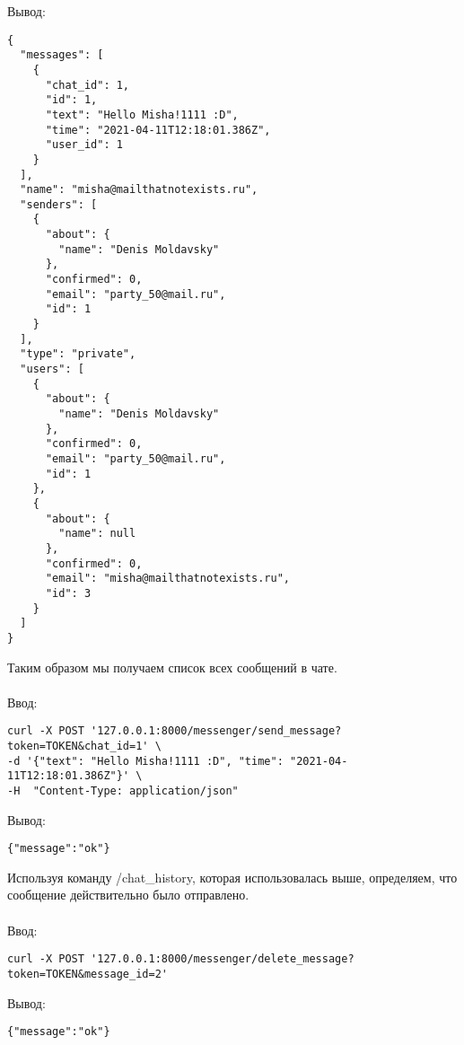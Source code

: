 \documentclass[testmethods]{espd}
\begin{document}
Вывод:

\begin{verbatim}
{
  "messages": [
    {
      "chat_id": 1,
      "id": 1,
      "text": "Hello Misha!1111 :D",
      "time": "2021-04-11T12:18:01.386Z",
      "user_id": 1
    }
  ],
  "name": "misha@mailthatnotexists.ru",
  "senders": [
    {
      "about": {
        "name": "Denis Moldavsky"
      },
      "confirmed": 0,
      "email": "party_50@mail.ru",
      "id": 1
    }
  ],
  "type": "private",
  "users": [
    {
      "about": {
        "name": "Denis Moldavsky"
      },
      "confirmed": 0,
      "email": "party_50@mail.ru",
      "id": 1
    },
    {
      "about": {
        "name": null
      },
      "confirmed": 0,
      "email": "misha@mailthatnotexists.ru",
      "id": 3
    }
  ]
}
\end{verbatim}

Таким образом мы получаем список всех сообщений в чате.

\paragraph{} %
Ввод:

\begin{verbatim}
curl -X POST '127.0.0.1:8000/messenger/send_message?token=TOKEN&chat_id=1' \
-d '{"text": "Hello Misha!1111 :D", "time": "2021-04-11T12:18:01.386Z"}' \
-H  "Content-Type: application/json"
\end{verbatim}

Вывод:

\begin{verbatim}
{"message":"ok"}
\end{verbatim}

Используя команду /chat\_history, которая использовалась выше, определяем, что сообщение действительно было отправлено.

\paragraph{} %
Ввод:

\begin{verbatim}
curl -X POST '127.0.0.1:8000/messenger/delete_message?token=TOKEN&message_id=2'
\end{verbatim}

Вывод:

\begin{verbatim}
{"message":"ok"}
\end{verbatim}
\end{document}
